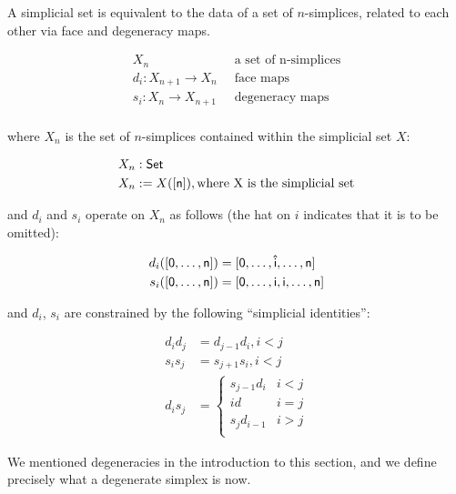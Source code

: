 \documentclass[10pt]{art}
\begin{document}
\begin{definition}
  A simplicial set is equivalent to the data of a set of $n$-simplices, related to each other via face and degeneracy maps.

  \begin{align*}
    X_n                             & \;\;\text{a set of n-simplices} \\
    d_i : X_{n + 1} \rightarrow X_n & \;\;\text{face maps}            \\
    s_i : X_n \rightarrow X_{n + 1} & \;\;\text{degeneracy maps}      \\
  \end{align*}

  where $X_n$ is the set of $n$-simplices contained within the simplicial set $X$:

  \begin{align*}
    X_n & : \mathsf{Set}                                             \\
    X_n & := X(\mathsf{[n]}), \text{where X is the simplicial set} \\
  \end{align*}

  and $d_i$ and $s_i$ operate on $X_n$ as follows (the hat on $i$ indicates that it is to be omitted):

  \begin{align*}
    d_i(\mathsf{[0, \ldots, n]}) & = \mathsf{[0, \ldots, \hat{i}, \ldots, n]} \\
    s_i(\mathsf{[0, \ldots, n]}) & = \mathsf{[0, \ldots, i, i, \ldots, n]}    \\
  \end{align*}

  and $d_i$, $s_i$ are constrained by the following ``simplicial identities'':

  \begin{align*}
    d_i d_j & = d_{j - 1} d_i, i < j \\
    s_i s_j & = s_{j + 1} s_i, i < j \\
    d_i s_j & =
    \begin{cases}
      s_{j - 1} d_i & i < j \\
      id            & i = j \\
      s_j d_{i - 1} & i > j \\
    \end{cases}
  \end{align*}
\end{definition}

We mentioned degeneracies in the introduction to this section, and we define precisely what a degenerate simplex is now.
\end{document}
